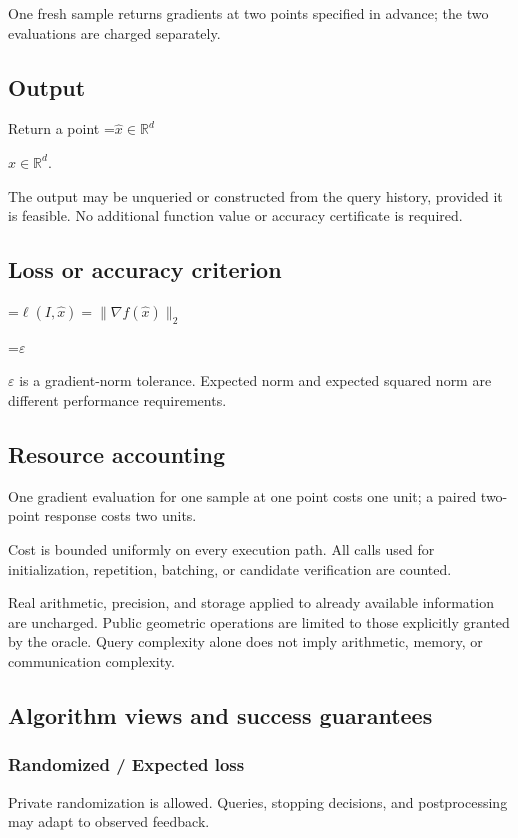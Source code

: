 \documentclass[10pt,a4paper]{article}
\newcommand{\AtlasMath}[1]{\par\begingroup\centering\setbox0=\hbox{$\displaystyle #1$}\ifdim\wd0>1.4\linewidth\typeout{ATLAS WIDE FORMULA: \the\wd0}\fi\ifdim\wd0>\linewidth\resizebox{\linewidth}{!}{\box0}\else\box0\fi\par\endgroup}
\newcommand{\AtlasInlineMath}[1]{\begingroup\setbox0=\hbox{$#1$}\ifdim\wd0>.4\linewidth\endgroup\AtlasMath{#1}\else\endgroup$#1$\fi}
\begin{document}
One fresh sample returns gradients at two points specified in advance; the two evaluations are charged separately.

\subsection{Output}
Return a point \AtlasInlineMath{\widehat x\in\mathbb R^d}.

The output may be unqueried or constructed from the query history, provided it is feasible. No additional function value or accuracy certificate is required.

\subsection{Loss or accuracy criterion}

\AtlasMath{\ell(I,\widehat{x})=\|\nabla f(\widehat{x})\|_2}


\AtlasInlineMath{\varepsilon} is a gradient-norm tolerance. Expected norm and expected squared norm are different performance requirements.

\subsection{Resource accounting}
One gradient evaluation for one sample at one point costs one unit; a paired two-point response costs two units.

Cost is bounded uniformly on every execution path. All calls used for initialization, repetition, batching, or candidate verification are counted.

Real arithmetic, precision, and storage applied to already available information are uncharged. Public geometric operations are limited to those explicitly granted by the oracle. Query complexity alone does not imply arithmetic, memory, or communication complexity.

\subsection{Algorithm views and success guarantees}
\subsubsection{Randomized / Expected loss}
Private randomization is allowed. Queries, stopping decisions, and postprocessing may adapt to observed feedback.
\end{document}
